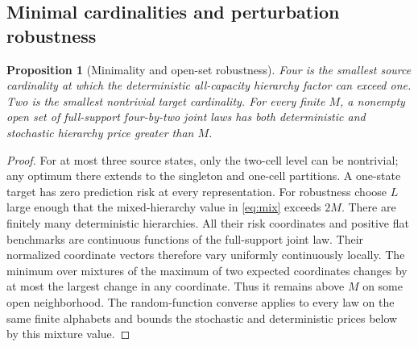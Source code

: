 \documentclass[11pt]{article}
\newtheorem{proposition}[theorem]{Proposition}
\theoremstyle{remark}\newtheorem{remark}[theorem]{Remark}
\begin{document}
\subsection{Minimal cardinalities and perturbation robustness}
\begin{proposition}[Minimality and open-set robustness]
\label{prop:robust}
Four is the smallest source cardinality at which the deterministic
all-capacity hierarchy factor can exceed one. Two is the smallest
nontrivial target cardinality. For every finite $M$, a nonempty open set
of full-support four-by-two joint laws has both deterministic and
stochastic hierarchy price greater than $M$.
\end{proposition}
\begin{proof}
For at most three source states, only the two-cell level can be nontrivial;
any optimum there extends to the singleton and one-cell partitions. A
one-state target has zero prediction risk at every representation.
For robustness choose $L$ large enough that the mixed-hierarchy value in
\eqref{eq:mix} exceeds $2M$. There are finitely many deterministic
hierarchies. All their risk coordinates and positive flat benchmarks are
continuous functions of the full-support joint law. Their normalized
coordinate vectors therefore vary uniformly continuously locally. The
minimum over mixtures of the maximum of two expected coordinates changes
by at most the largest change in any coordinate. Thus it remains above
$M$ on some open neighborhood. The random-function converse applies to
every law on the same finite alphabets and bounds the stochastic and
deterministic prices below by this mixture value.
\end{proof}
\end{document}
